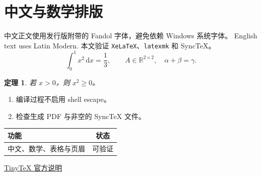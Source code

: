 \documentclass[UTF8,fontset=fandol,12pt,a4paper]{ctexart}
\newtheorem{theorem}{定理}
\begin{document}
\section{中文与数学排版}
中文正文使用发行版附带的 Fandol 字体，避免依赖 Windows 系统字体。
English text uses Latin Modern. 本文验证 \texttt{XeLaTeX}、\texttt{latexmk} 和 SyncTeX。
\begin{equation}
  \int_0^1 x^2\,\mathrm{d}x=\frac{1}{3},\qquad
  A\in\mathbb{R}^{2\times2},\quad \alpha+\beta=\gamma.
\end{equation}
\begin{theorem}若 $x>0$，则 $x^2\geq0$。\end{theorem}
\begin{enumerate}[label=\arabic*.]
  \item 编译过程不启用 shell escape。
  \item 检查生成 PDF 与非空的 SyncTeX 文件。
\end{enumerate}
\begin{center}
\begin{tabular}{lc}
\toprule 功能 & 状态 \\
\midrule 中文、数学、表格与页眉 & 可验证 \\
\bottomrule
\end{tabular}
\end{center}
\href{https://yihui.org/tinytex/}{TinyTeX 官方说明}
\end{document}
